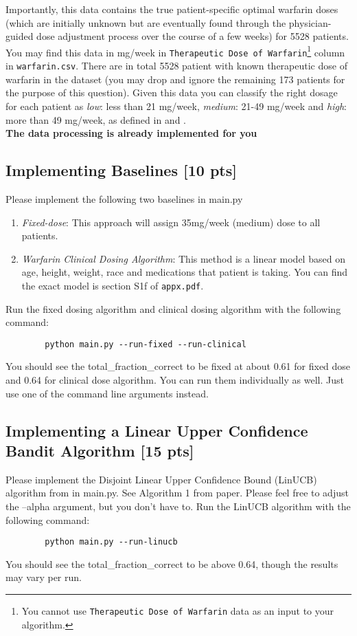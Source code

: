 \documentclass[11pt]{article}
\begin{document}
\noindent Importantly, this data contains the true patient-specific optimal warfarin doses (which are initially unknown but are eventually found through the physician-guided dose adjustment process over the course of a few weeks) for 5528 patients. You may find this data in mg/week in \texttt{Therapeutic Dose of Warfarin}\footnote{You cannot use \texttt{Therapeutic Dose of Warfarin} data as an input to your algorithm. } column in \texttt{warfarin.csv}. There are in total 5528 patient with known therapeutic dose of warfarin in the dataset (you may drop and ignore the remaining 173 patients for the purpose of this question). Given this data you can classify the right dosage for each patient as \textit{low}: less than 21 mg/week, \textit{medium}: 21-49 mg/week and \textit{high}: more than 49 mg/week, as defined in \cite{international2009estimation} and .
\ \\
\noindent \textbf{The data processing is already implemented for you} 


\subsection{Implementing Baselines [10 pts] }\label{sec:warmup}
\noindent Please implement the following two baselines in main.py 
\begin{enumerate}
    \item \textit{Fixed-dose}: This approach will assign 35mg/week (medium) dose to all patients.
    \item \textit{Warfarin Clinical Dosing Algorithm}: This method is a linear model based on age, height, weight, race and medications that patient is taking. You can find the exact model is section S1f of \texttt{appx.pdf}.
\end{enumerate}
Run the fixed dosing algorithm and clinical dosing algorithm with the following command:
\begin{verbatim}
        python main.py --run-fixed --run-clinical
\end{verbatim}
You should see the total\_fraction\_correct to be fixed at about 0.61 for fixed dose and 0.64 for clinical dose algorithm. You can run them individually as well. Just use one of the command line arguments instead.


\subsection{Implementing a Linear Upper Confidence Bandit Algorithm [15 pts]}
Please implement the Disjoint Linear Upper Confidence Bound (LinUCB) algorithm from \cite{li2010contextual} in main.py. See Algorithm 1 from paper. Please feel free to adjust the --alpha argument, but you don't have to.  Run the LinUCB algorithm with the following command:
\begin{verbatim}
        python main.py --run-linucb
\end{verbatim}
You should see the total\_fraction\_correct to be above 0.64, though the results may vary per run.
\end{document}
